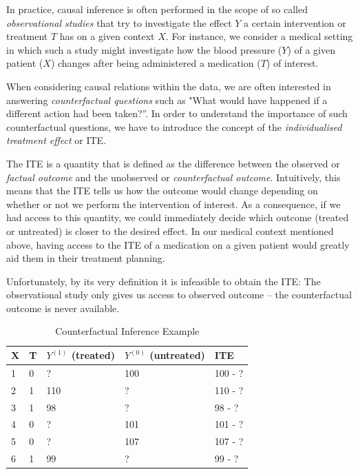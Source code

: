In practice, causal inference is often performed in the scope of so called \emph{observational studies} that try to investigate the effect $Y$ a certain intervention or treatment $T$ has on a given context $X$. For instance, we consider a medical setting in which such a study might investigate how the blood pressure ($Y$) of a given patient ($X$) changes after being administered a medication ($T$) of interest.

When considering causal relations within the data, we are often interested in answering \emph{counterfactual questions} such as "What would have happened if a different action had been taken?”. In order to understand the importance of such counterfactual questions, we have to introduce the concept of the \emph{individualised treatment effect} or ITE.

The ITE is a quantity that is defined as the difference between the observed or \emph{factual outcome} and the unobserved or \emph{counterfactual outcome}. Intuitively, this means that the ITE tells us how the outcome would change depending on whether or not we perform %
the intervention of interest. 
As a consequence, if we had access to this quantity, we could immediately decide which outcome (treated or untreated) is closer to the desired effect. In our medical context mentioned above, having access to the ITE of a medication on a given patient would greatly aid them in their treatment planning. 

Unfortunately, by its very definition it is infeasible to obtain the ITE: The observational study only gives us access to observed outcome -- the counterfactual outcome is never available. 
\begin{table}[]
	\centering
	\caption{Counterfactual Inference Example}
	\label{tab:counterfactual-inference-motiviation}
	\begin{tabular}{@{}lllll@{}}
		\toprule
		X & T & $Y^{(1)}$ (treated) & $Y^{(0)}$ (untreated) & ITE \\ \midrule
		1 & 0 & ? & 100 & 100 - ? \\
		2 & 1 & 110 & ? & 110 - ?  \\
		3 & 1 & 98 & ? &  98 - ?  \\
		4 & 0 & ? & 101 & 101 - ? \\
		5 & 0 & ? & 107 &  107 - ? \\
		6 & 1 & 99 & ? &  99 - ?\\ \bottomrule
	\end{tabular}
\end{table}

